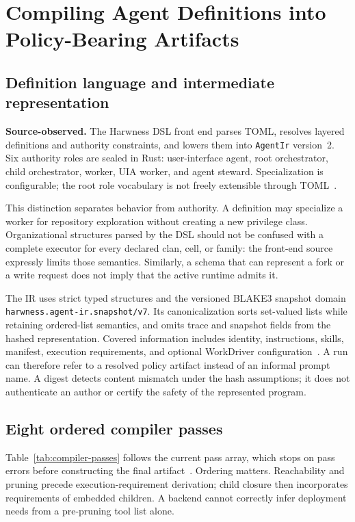 \section{Compiling Agent Definitions into Policy-Bearing Artifacts}
\label{sec:compiler}

\subsection{Definition language and intermediate representation}

\textbf{Source-observed.} The Harwness DSL front end parses TOML, resolves layered definitions and authority constraints, and lowers them into \texttt{AgentIr} version~2. Six authority roles are sealed in Rust: user-interface agent, root orchestrator, child orchestrator, worker, UIA worker, and agent steward. Specialization is configurable; the root role vocabulary is not freely extensible through TOML~\cite{ref15}.

This distinction separates behavior from authority. A definition may specialize a worker for repository exploration without creating a new privilege class. Organizational structures parsed by the DSL should not be confused with a complete executor for every declared clan, cell, or family: the front-end source expressly limits those semantics. Similarly, a schema that can represent a fork or a write request does not imply that the active runtime admits it.

The IR uses strict typed structures and the versioned BLAKE3 snapshot domain \texttt{harwness.agent-ir.snapshot/v7}. Its canonicalization sorts set-valued lists while retaining ordered-list semantics, and omits trace and snapshot fields from the hashed representation. Covered information includes identity, instructions, skills, manifest, execution requirements, and optional WorkDriver configuration~\cite{ref16}. A run can therefore refer to a resolved policy artifact instead of an informal prompt name. A digest detects content mismatch under the hash assumptions; it does not authenticate an author or certify the safety of the represented program.

\subsection{Eight ordered compiler passes}
\label{sec:compiler-passes}

Table~\ref{tab:compiler-passes} follows the current pass array, which stops on pass errors before constructing the final artifact~\cite{ref5}. Ordering matters. Reachability and pruning precede execution-requirement derivation; child closure then incorporates requirements of embedded children. A backend cannot correctly infer deployment needs from a pre-pruning tool list alone.

